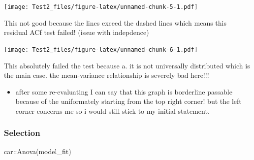 \documentclass[
]{article}
\newenvironment{Shaded}{\begin{snugshade}}{\end{snugshade}}
\newcommand{\AttributeTok}[1]{\textcolor[rgb]{0.77,0.63,0.00}{#1}}
\newcommand{\FloatTok}[1]{\textcolor[rgb]{0.00,0.00,0.81}{#1}}
\newcommand{\FunctionTok}[1]{\textcolor[rgb]{0.00,0.00,0.00}{#1}}
\newcommand{\NormalTok}[1]{#1}
\newcommand{\OtherTok}[1]{\textcolor[rgb]{0.56,0.35,0.01}{#1}}
\newcommand{\SpecialCharTok}[1]{\textcolor[rgb]{0.00,0.00,0.00}{#1}}
\newcommand{\StringTok}[1]{\textcolor[rgb]{0.31,0.60,0.02}{#1}}
\providecommand{\tightlist}{%
  \setlength{\itemsep}{0pt}\setlength{\parskip}{0pt}}
\begin{document}
\texttt{[image: Test2\_files/figure-latex/unnamed-chunk-5-1.pdf]}

This not good because the lines exceed the dashed lines which means this
residual ACf test failed! (issue with indepdence)

\begin{Shaded}
\end{Shaded}

\texttt{[image: Test2\_files/figure-latex/unnamed-chunk-6-1.pdf]}

This absolutely failed the test because a. it is not universally
distributed which is the main case. the mean-variance relationship is
severely bad here!!!

\begin{itemize}
\tightlist
\item
  after some re-evaluating I can say that this graph is borderline
  passable because of the uniformately starting from the top right
  corner! but the left corner concerns me so i would still stick to my
  initial statement.
\end{itemize}

\hypertarget{selection}{%
\subsubsection{Selection}\label{selection}}

\begin{Shaded}
\begin{Highlighting}[]
\NormalTok{car}\SpecialCharTok{::}\FunctionTok{Anova}\NormalTok{(model\_fit)}
\end{Highlighting}
\end{Shaded}
\end{document}

